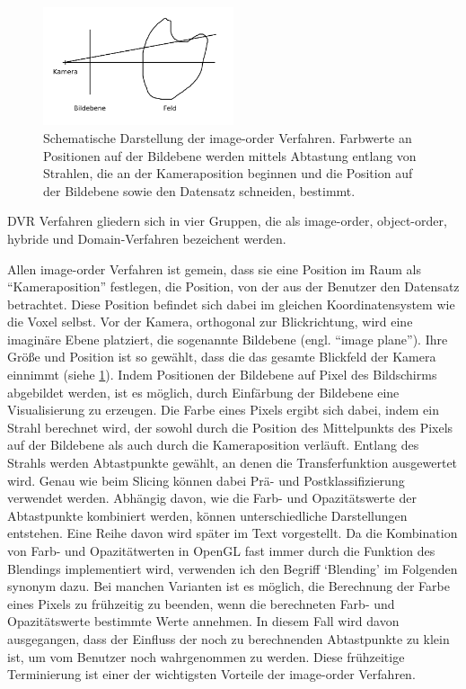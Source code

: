 \documentclass[a4paper,fontsize=12pt,toc=bib,halfparskip,ngerman]{scrartcl}
\begin{document}
\begin{figure}
	\centering
	\includegraphics[width=0.5\textwidth]{pictures/DVR}
	\caption{Schematische Darstellung der image-order Verfahren. Farbwerte an Positionen auf der Bildebene werden mittels Abtastung entlang von Strahlen, die an der Kameraposition beginnen und die Position auf der Bildebene sowie den Datensatz schneiden, bestimmt.}
	\label{image-order}
\end{figure}

DVR Verfahren gliedern sich in vier Gruppen, die als image-order, object-order, hybride und Domain-Verfahren bezeichent werden.

Allen image-order Verfahren ist gemein, dass sie eine Position im Raum als ``Kameraposition'' festlegen, die Position, von der aus der Benutzer den Datensatz betrachtet. Diese Position befindet sich dabei im gleichen Koordinatensystem wie die Voxel selbst. Vor der Kamera, orthogonal zur Blickrichtung, wird eine imagin\"are Ebene platziert, die sogenannte Bildebene (engl. ``image plane''). Ihre Gr\"o{\ss}e und Position ist so gew\"ahlt, dass die das gesamte Blickfeld der Kamera einnimmt (siehe \cref{image-order}). Indem Positionen der Bildebene auf Pixel des Bildschirms abgebildet werden, ist es m\"oglich, durch Einf\"arbung der Bildebene eine Visualisierung zu erzeugen. Die Farbe eines Pixels ergibt sich dabei, indem ein Strahl berechnet wird, der sowohl durch die Position des Mittelpunkts des Pixels auf der Bildebene als auch durch die Kameraposition verl\"auft. Entlang des Strahls werden Abtastpunkte gew\"ahlt, an denen die Transferfunktion ausgewertet wird. Genau wie beim Slicing k\"onnen dabei Pr\"a- und Postklassifizierung verwendet werden. Abh\"angig davon, wie die Farb- und Opazit\"atswerte der Abtastpunkte kombiniert werden, k\"onnen unterschiedliche Darstellungen entstehen. Eine Reihe davon wird sp\"ater im Text vorgestellt. Da die Kombination von Farb- und Opazit\"atwerten in OpenGL fast immer durch die Funktion des Blendings implementiert wird, verwenden ich den Begriff `Blending' im Folgenden synonym dazu. Bei manchen Varianten ist es m\"oglich, die Berechnung der Farbe eines Pixels zu fr\"uhzeitig zu beenden, wenn die berechneten Farb- und Opazit\"atswerte bestimmte Werte annehmen. In diesem Fall wird davon ausgegangen, dass der Einfluss der noch zu berechnenden Abtastpunkte zu klein ist, um vom Benutzer noch wahrgenommen zu werden. Diese fr\"uhzeitige Terminierung ist einer der wichtigsten Vorteile der image-order Verfahren. 
\end{document}
